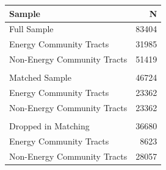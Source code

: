 \begin{tabular}{lr}
  \toprule
Sample & N \\ 
  \midrule
Full Sample & 83404 \\ 
  \quad Energy Community Tracts & 31985 \\ 
  \quad Non-Energy Community Tracts & 51419 \\ 
   &  \\ 
  Matched Sample & 46724 \\ 
  \quad Energy Community Tracts & 23362 \\ 
  \quad Non-Energy Community Tracts & 23362 \\ 
   &  \\ 
  Dropped in Matching & 36680 \\ 
  \quad Energy Community Tracts & 8623 \\ 
  \quad Non-Energy Community Tracts & 28057 \\ 
   \bottomrule
\end{tabular}
